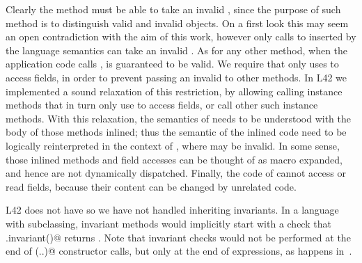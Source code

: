 Clearly the \Q@invariant@ method must be able to take an invalid \Q@this@, since the purpose of such method is to distinguish valid and invalid objects.
On a first look this may seem an open contradiction
with the aim of this work, however only calls to \Q@invariant@ inserted by the language semantics can take an invalid \Q@this@. As for any other method, when the application code calls \Q@invariant@,
\Q@this@ is guaranteed to be valid.
We require that \Q@invariant@
only uses \Q@this@ to access fields,
in order to prevent passing an invalid \Q@this@ to other methods.
In L42 we implemented a sound relaxation of this restriction, by allowing calling instance methods that in turn only use \Q@this@ to access fields, or call other such instance methods. With this relaxation, the semantics of \Q@invariant@ needs to be understood with the body of those methods inlined; thus the semantic of the inlined code need to be logically reinterpreted in the context of \Q@invariant@, where \Q@this@ may be invalid.
In some sense, those inlined methods and field accesses can be thought of as macro expanded, and hence are not dynamically dispatched. 
Finally, the code of \Q@invariant@ cannot access \Q@mut@ or read fields, because their content can be changed by unrelated code.



L42 does not have \Q@extends@ so we have not handled inheriting invariants.
In a language with subclassing, invariant methods would implicitly start with a check that \Q@super.invariant()@ returns \Q@true@.
Note that invariant checks would not be performed at the end of \Q@super(..)@ constructor calls, but only at the end of \Q@new@ expressions, as happens in~\cite{feldman2006jose}.





%
